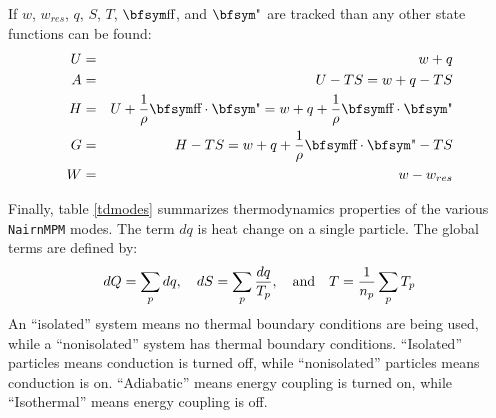 \documentclass[11pt]{book}
\begin{document}
If $w$, $w_{res}$, $q$, $S$, $T$, $\st$, and $\et$ are tracked than any other state functions can be found:
\begin{eqnarray}
           U & = & w+q \\
           A & = & U - TS = w+q-TS \\
           H & = & U + {1\over\rho} \st\cdot\et = w+q+ {1\over\rho} \st\cdot\et \\
           G & = & H-TS = w+q+ {1\over\rho} \st\cdot\et - TS \\
           W & = & w - w_{res}
\end{eqnarray}

Finally, table \ref{tdmodes} summarizes thermodynamics properties of the various {\tt NairnMPM} modes. The term $dq$ is heat change on a single particle. The global terms are defined by:
\begin{equation}
     dQ = \sum_p dq, \quad dS = \sum_p {dq\over T_p}, \quad{\rm and}\quad T = {1\over n_p}\sum_p T_p
\end{equation}
An ``isolated'' system means no thermal boundary conditions are being used, while a ``nonisolated'' system has thermal boundary conditions. ``Isolated'' particles means conduction is turned off, while ``nonisolated'' particles means conduction is on. ``Adiabatic'' means energy coupling is turned on, while ``Isothermal'' means energy coupling is off.
\end{document}
